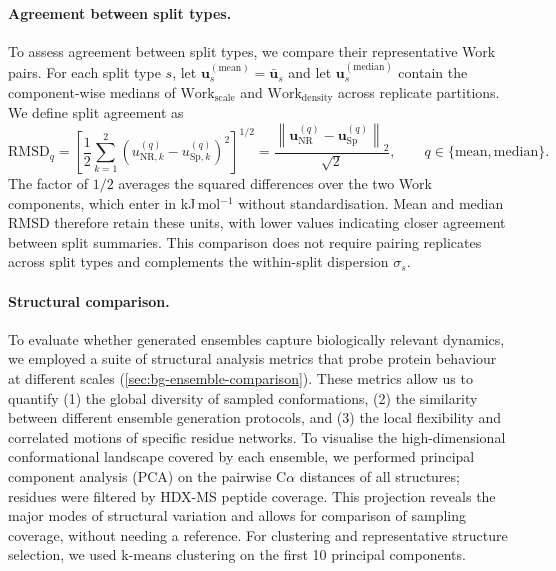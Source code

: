 \paragraph{Agreement between split types.}
To assess agreement between split types, we compare their representative Work pairs. For each split type $s$, let $\mathbf u_s^{(\mathrm{mean})}=\bar{\mathbf u}_s$ and let $\mathbf u_s^{(\mathrm{median})}$ contain the component-wise medians of $\text{Work}_\text{scale}$ and $\text{Work}_\text{density}$ across replicate partitions. We define split agreement as
\begin{equation}
    \mathrm{RMSD}_q
    =\left[\frac{1}{2}\sum_{k=1}^{2}\left(u_{\mathrm{NR},k}^{(q)}-u_{\mathrm{Sp},k}^{(q)}\right)^2\right]^{1/2}
    =\frac{\left\lVert\mathbf u_\mathrm{NR}^{(q)}-\mathbf u_\mathrm{Sp}^{(q)}\right\rVert_2}{\sqrt{2}},
    \qquad q\in\{\mathrm{mean},\mathrm{median}\}.
    \label{eq:valdx-split-agreement}
\end{equation}
The factor of $1/2$ averages the squared differences over the two Work components, which enter in kJ\,mol$^{-1}$ without standardisation. Mean and median RMSD therefore retain these units, with lower values indicating closer agreement between split summaries. This comparison does not require pairing replicates across split types and complements the within-split dispersion $\sigma_s$.

\paragraph{Structural comparison.}
To evaluate whether generated ensembles capture biologically relevant dynamics, we employed a suite of structural analysis metrics that probe protein behaviour at different scales (\cref{sec:bg-ensemble-comparison}). These metrics allow us to quantify (1) the global diversity of sampled conformations, (2) the similarity between different ensemble generation protocols, and (3) the local flexibility and correlated motions of specific residue networks. To visualise the high-dimensional conformational landscape covered by each ensemble, we performed principal component analysis (PCA) on the pairwise C$\alpha$ distances of all structures; residues were filtered by HDX-MS peptide coverage. This projection reveals the major modes of structural variation and allows for comparison of sampling coverage, without needing a reference. For clustering and representative structure selection, we used k-means clustering on the first 10 principal components.

